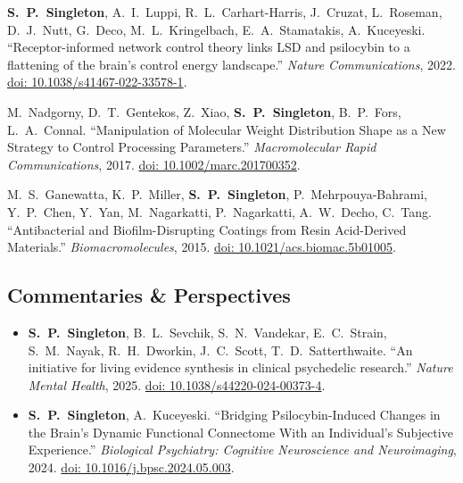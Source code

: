 \documentclass[11pt, letterpaper]{article}
\newcommand{\me}{\textbf{S.\ P.\ Singleton}}
\begin{document}
\begin{etaremune}[itemsep=5pt]
  \item \me, A.\ I.\ Luppi, R.\ L.\ Carhart-Harris, J.\ Cruzat, L.\ Roseman, D.\ J.\ Nutt, G.\ Deco, M.\ L.\ Kringelbach, E.\ A.\ Stamatakis, A.\ Kuceyeski.
    ``Receptor-informed network control theory links LSD and psilocybin to a flattening of the brain's control energy landscape.''
    \textit{Nature Communications}, 2022.
    \href{https://doi.org/10.1038/s41467-022-33578-1}{doi: 10.1038/s41467-022-33578-1}.

  \item M.\ Nadgorny, D.\ T.\ Gentekos, Z.\ Xiao, \me, B.\ P.\ Fors, L.\ A.\ Connal.
    ``Manipulation of Molecular Weight Distribution Shape as a New Strategy to Control Processing Parameters.''
    \textit{Macromolecular Rapid Communications}, 2017.
    \href{https://doi.org/10.1002/marc.201700352}{doi: 10.1002/marc.201700352}.

  \item M.\ S.\ Ganewatta, K.\ P.\ Miller, \me, P.\ Mehrpouya-Bahrami, Y.\ P.\ Chen, Y.\ Yan, M.\ Nagarkatti, P.\ Nagarkatti, A.\ W.\ Decho, C.\ Tang.
    ``Antibacterial and Biofilm-Disrupting Coatings from Resin Acid-Derived Materials.''
    \textit{Biomacromolecules}, 2015.
    \href{https://doi.org/10.1021/acs.biomac.5b01005}{doi: 10.1021/acs.biomac.5b01005}.
\end{etaremune}

\subsection{Commentaries \& Perspectives}

\begin{itemize}[label=\textbullet]
  \item \me, B.\ L.\ Sevchik, S.\ N.\ Vandekar, E.\ C.\ Strain, S.\ M.\ Nayak, R.\ H.\ Dworkin, J.\ C.\ Scott, T.\ D.\ Satterthwaite.
    ``An initiative for living evidence synthesis in clinical psychedelic research.''
    \textit{Nature Mental Health}, 2025.
    \href{https://doi.org/10.1038/s44220-024-00373-4}{doi: 10.1038/s44220-024-00373-4}.

  \item \me, A.\ Kuceyeski.
    ``Bridging Psilocybin-Induced Changes in the Brain's Dynamic Functional Connectome With an Individual's Subjective Experience.''
    \textit{Biological Psychiatry: Cognitive Neuroscience and Neuroimaging}, 2024.
    \href{https://doi.org/10.1016/j.bpsc.2024.05.003}{doi: 10.1016/j.bpsc.2024.05.003}.
\end{itemize}
\end{document}
